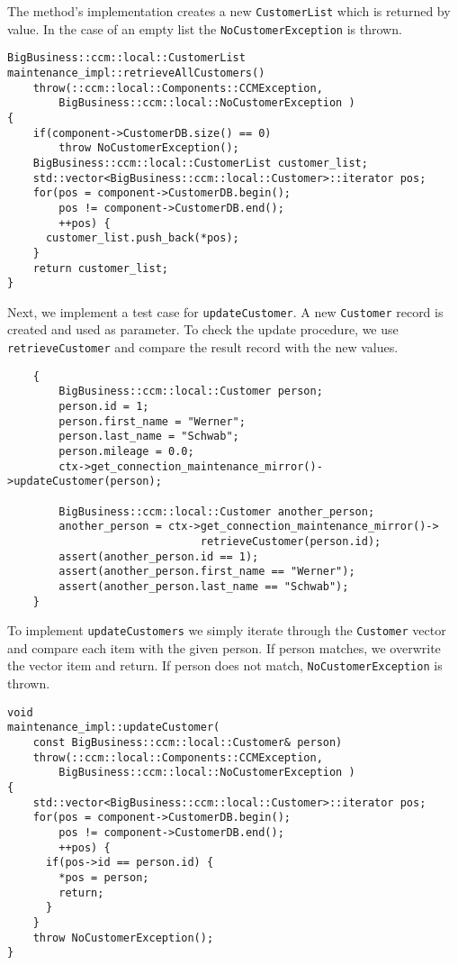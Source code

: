 The method's implementation creates a new {\tt CustomerList} which
is returned by value.
In the case of an empty list the {\tt NoCustomerException} is thrown.

\begin{small}
\begin{verbatim}
BigBusiness::ccm::local::CustomerList
maintenance_impl::retrieveAllCustomers()
    throw(::ccm::local::Components::CCMException,
        BigBusiness::ccm::local::NoCustomerException )
{
    if(component->CustomerDB.size() == 0)
        throw NoCustomerException();
    BigBusiness::ccm::local::CustomerList customer_list;
    std::vector<BigBusiness::ccm::local::Customer>::iterator pos;
    for(pos = component->CustomerDB.begin(); 
        pos != component->CustomerDB.end(); 
        ++pos) {
      customer_list.push_back(*pos);
    }
    return customer_list;
}
\end{verbatim}
\end{small}

Next, we implement a test case for {\tt updateCustomer}.
A new {\tt Customer} record is created and used as parameter.
To check the update procedure, we use {\tt retrieveCustomer} 
and compare the result record with the new values.
\begin{small}
\begin{verbatim}
    {
        BigBusiness::ccm::local::Customer person;
        person.id = 1;
        person.first_name = "Werner";
        person.last_name = "Schwab";
        person.mileage = 0.0;
        ctx->get_connection_maintenance_mirror()->updateCustomer(person);      
        
        BigBusiness::ccm::local::Customer another_person;
        another_person = ctx->get_connection_maintenance_mirror()->
                              retrieveCustomer(person.id);
        assert(another_person.id == 1);
        assert(another_person.first_name == "Werner");
        assert(another_person.last_name == "Schwab");
    }
\end{verbatim}
\end{small}

To implement {\tt updateCustomers} we simply iterate through the {\tt Customer}
vector and compare each item with the given person.
If person matches, we overwrite the vector item and return.
If person does not match, {\tt NoCustomerException} is thrown.

\begin{small}
\begin{verbatim}
void
maintenance_impl::updateCustomer(
    const BigBusiness::ccm::local::Customer& person)
    throw(::ccm::local::Components::CCMException,
        BigBusiness::ccm::local::NoCustomerException )
{
    std::vector<BigBusiness::ccm::local::Customer>::iterator pos;
    for(pos = component->CustomerDB.begin(); 
        pos != component->CustomerDB.end(); 
        ++pos) {
      if(pos->id == person.id) {
        *pos = person;
        return;
      }
    }
    throw NoCustomerException();  
}
\end{verbatim}
\end{small}


